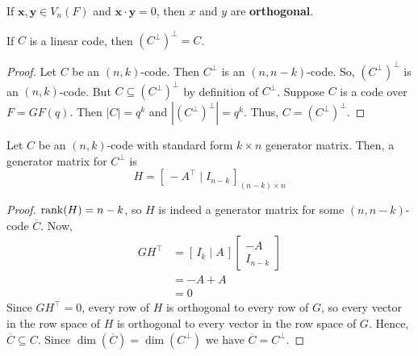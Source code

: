 
\begin{defbox}
    \begin{definition}
        If $ \bm{x},\bm{y}\in V_n(F) $ and $ \bm{x}\cdot \bm{y}=0 $, then $ x $ and $ y $
        are \textbf{orthogonal}.
    \end{definition} \end{defbox}

\begin{thmbox}
    \begin{theorem}
        If $ C $ is a linear code, then $ (C^{\perp})^{\perp}=C $.
    \end{theorem} \end{thmbox}

\begin{proof}
    Let $ C $ be an $ (n,k) $-code. Then $ C^{\perp} $ is an $ (n,n-k) $-code.
    So, $ (C^{\perp})^{\perp} $ is an $ (n,k) $-code. But
    $ C\subseteq (C^{\perp})^{\perp} $ by definition of $ C^{\perp} $.
    Suppose $ C $ is a code over $ F=GF(q) $. Then $ |C|=q^k $
    and $ |(C^{\perp})^{\perp}|=q^k $. Thus, $ C=(C^{\perp})^{\perp} $.
\end{proof}

\begin{thmbox}
    \begin{theorem}
        Let $ C $ be an $ (n,k) $-code with standard form $ k\times n $ generator matrix.
        Then, a generator matrix for $ C^{\perp} $ is
        \[ H=\left[ \,-A^{\top}\mid I_{n-k}\, \right]_{(n-k)\times n} \]
    \end{theorem} \end{thmbox}

\begin{proof}
    $ \operatorname{rank}(H)=n-k $, so $ H $ is indeed a generator matrix for some $ (n,n-k) $-code
    $ \overline{C} $. Now,
    \begin{align*}
        GH^{\top}
         & =\left[ \,I_k\mid A\, \right]
        \begin{bmatrix}
            -A \\
            I_{n-k}
        \end{bmatrix}        \\
         & =-A+A                         \\
         & =0
    \end{align*}
    Since $ GH^{\top}=0 $, every row of $ H $ is orthogonal to every row of $ G $,
    so every vector in the row space of $ H $ is orthogonal to every vector in
    the row space of $ G $. Hence, $ \overline{C}\subseteq C $. Since
    $ \dim(\overline{C})=\dim(C^{\perp}) $ we have $ \overline{C}=C^{\perp} $.
\end{proof}

